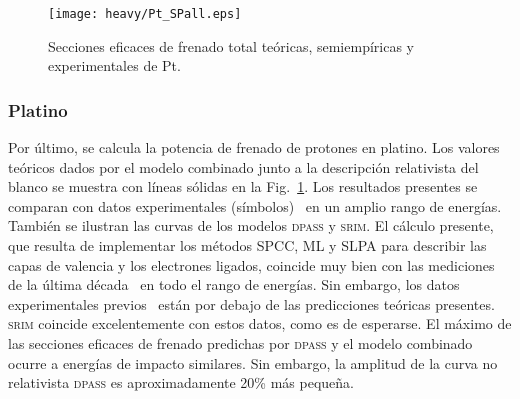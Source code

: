 \begin{figure}[t]
\centering
\texttt{[image: heavy/Pt\_SPall.eps]}
\caption[Secciones eficaces teóricas, semiempíricas y experimentales de 
Pt.]
{Secciones eficaces de frenado total teóricas, semiempíricas y
experimentales de Pt.}
\label{fig:Pt_SP}
\end{figure}

\subsubsection{Platino}

Por último, se calcula la potencia de frenado de protones en platino. 
Los valores teóricos dados por el modelo combinado junto a la 
descripción relativista del blanco se muestra con líneas sólidas en la 
Fig.~\ref{fig:Pt_SP}. Los resultados presentes se comparan con 
datos experimentales (símbolos)~\cite{iaea,Primetzhofer:12,Goebl:13,
Celedon:15,Moro:20} en un amplio rango de energías. También 
se ilustran las curvas de los modelos \textsc{dpass} y \textsc{srim}. 
El cálculo presente, que resulta de implementar los métodos SPCC, ML y 
SLPA para describir las capas de valencia y los electrones ligados, 
coincide muy bien con las mediciones de la última 
década~\cite{Primetzhofer:12,Goebl:13,Celedon:15,Moro:20} en todo el 
rango de energías. Sin embargo, los datos experimentales 
previos~\cite{iaea,Krist:83,Sirotinin:84,Ishiwari:74,Ishiwari:79,
Ogino:88,Sakamoto:91,Shiomi:94} están por 
debajo de las predicciones teóricas presentes. \textsc{srim} coincide 
excelentemente con estos datos, como es de esperarse. El máximo de las 
secciones eficaces de frenado predichas por \textsc{dpass} y el modelo 
combinado 
ocurre a energías de impacto similares. Sin embargo, la amplitud de la 
curva no relativista \textsc{dpass} es aproximadamente 20\% más pequeña. 



